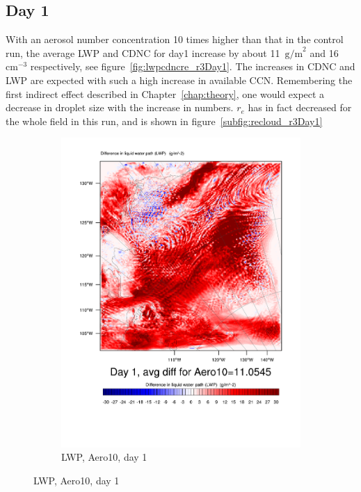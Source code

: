 \subsection{Day 1}
With an aerosol number concentration 10 times higher than that in the control run, the average LWP and CDNC for day1 increase by about 11~$\text{g/m}^2$ and 16~$\text{cm}^{-3}$ respectively, see figure~\ref{fig:lwpcdncre_r3Day1}. The increases in CDNC and LWP are expected with such a high increase in available CCN. Remembering the first indirect effect described in Chapter~\ref{chap:theory}, one would expect a decrease in droplet size with the increase in numbers. $r_e$ has in fact decreased for the whole field in this run, and is shown in figure~\ref{subfig:recloud_r3Day1}

\begin{figure}[hb]
\centering
	\begin{subfigure}{0.40\textwidth}
		\centering
		\includegraphics[width=\textwidth]{results/aero10/Diff_LWP_Day1Aero10.pdf}
		\caption{LWP, Aero10, day 1}

\end{subfigure}
\end{figure}
